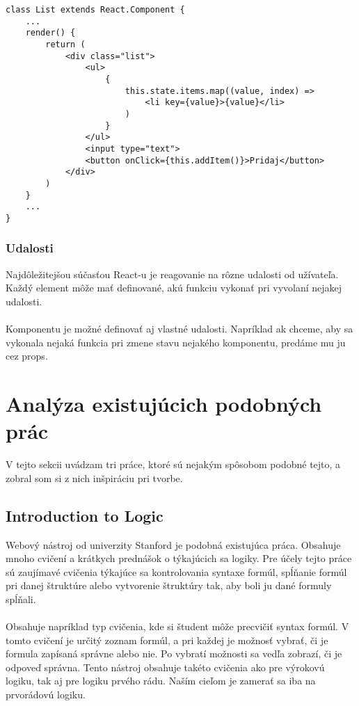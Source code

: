 \begin{lstlisting}[caption={Vykresľovanie komponentu \texttt{List}},label={lst:list_render}]
class List extends React.Component {
	...
	render() {
		return (
			<div class="list">
				<ul>
					{
						this.state.items.map((value, index) => 
							<li key={value}>{value}</li>					
						)				
					}
				</ul>
				<input type="text">
				<button onClick={this.addItem()}>Pridaj</button>
			</div>	
		)
	}
	...
} 
\end{lstlisting}





\subsubsection{Udalosti}
Najdôležitejšou súčasťou React-u je reagovanie na rôzne udalosti od užívateľa. Každý element môže mať definované, akú funkciu vykonať pri vyvolaní nejakej udalosti. 
\paragraph{}
Komponentu je možné definovať aj vlastné udalosti. Napríklad ak chceme, aby sa vykonala nejaká funkcia pri zmene stavu nejakého komponentu, predáme mu ju cez props.



\section{Analýza existujúcich podobných prác}
V tejto sekcii uvádzam tri práce, ktoré sú nejakým spôsobom podobné tejto, a zobral som si z nich inšpiráciu pri tvorbe.

\subsection{Introduction to Logic}
Webový nástroj od univerzity Stanford \cite{intro_to_logic} je podobná existujúca práca. Obsahuje mnoho cvičení a krátkych prednášok o týkajúcich sa logiky. Pre účely tejto práce sú zaujímavé cvičenia týkajúce sa kontrolovania syntaxe formúl, spĺňanie formúl pri danej štruktúre alebo vytvorenie štruktúry tak, aby boli ju dané formuly spĺňali.

\paragraph{}
Obsahuje napríklad typ cvičenia, kde si študent môže precvičiť syntax formúl. V tomto cvičení je určitý zoznam formúl, a pri každej je možnosť vybrať, či je formula zapísaná správne alebo nie. Po vybratí možnosti sa vedľa zobrazí, či je odpoveď správna. Tento nástroj obsahuje takéto cvičenia ako pre výrokovú logiku, tak aj pre logiku prvého rádu. Naším cieľom je zamerať sa iba na prvorádovú logiku. 


